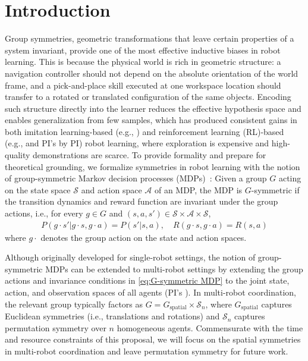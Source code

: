 \documentclass[11pt]{article}
\begin{document}
\section{Introduction}
Group symmetries, geometric transformations that leave certain properties of a system invariant, provide one of the most effective inductive biases in robot learning.
This is because the physical world is rich in geometric structure: a navigation controller should not depend on the absolute orientation of the world frame, and a pick-and-place skill executed at one workspace location should transfer to a rotated or translated configuration of the same objects.
Encoding such structure directly into the learner reduces the effective hypothesis space and enables generalization from few samples, which has produced consistent gains in both imitation learning-based (e.g., \citep{zeng2021transporter,wang2024equivariantdiffusion,seo2025survey}) and reinforcement learning (RL)-based (e.g., \citep{vanderpol2020mdp,wang2022so2} and PI's \citep{luo2024reinforcement} by PI) robot learning, where exploration is expensive and high-quality demonstrations are scarce.
To provide formality and prepare for theoretical grounding, we formalize symmetries in robot learning with the notion of group-symmetric Markov decision processes (MDPs)~\citep{vanderpol2020mdp,wang2022so2}:
Given a group $G$ acting on the state space $\mathcal{S}$ and action space $\mathcal{A}$ of an MDP, the MDP is $G$-symmetric if the transition dynamics and reward function are invariant under the group actions, i.e., for every $g\in G$ and
$(s,a,s')\in\mathcal{S}\times\mathcal{A}\times\mathcal{S}$,
\begin{align} \label{eq:G-symmetric MDP}
P(g \cdot s' | g \cdot s, g \cdot a) = P(s' | s, a), \quad R(g \cdot s, g \cdot a) = R(s, a)
\end{align}
where $g \cdot$ denotes the group action on the state and action spaces.

Although originally developed for single-robot settings, the notion of group-symmetric MDPs can be extended to multi-robot settings by extending the group actions and invariance conditions in \eqref{eq:G-symmetric MDP} to the joint state, action, and observation spaces of all agents (PI's \citep{chen20243}).
In multi-robot coordination, the relevant group typically factors as $G = G_{\text{spatial}} \times \mathcal{S}_n$, where $G_{\text{spatial}}$ captures Euclidean symmetries (i.e., translations and rotations) and $\mathcal{S}_n$ captures permutation symmetry over $n$ homogeneous agents.
Commensurate with the time and resource constraints of this proposal, we will focus on the spatial symmetries in multi-robot coordination and leave permutation symmetry for future work. 
\end{document}
